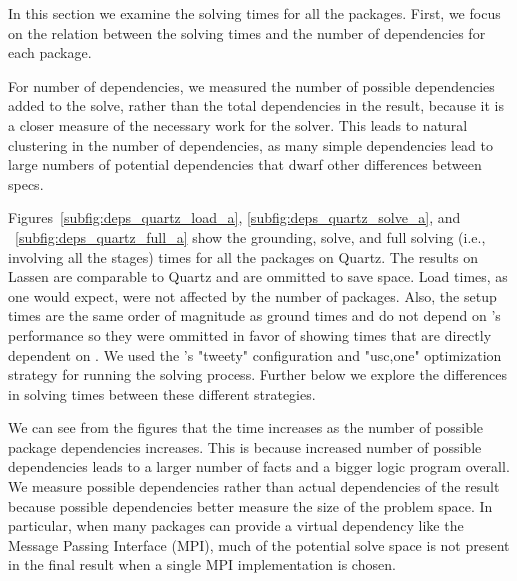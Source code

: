 In this section we examine the solving times for all the packages. First, we focus on the relation between the solving times and the number of dependencies for each package.

For number of dependencies, we measured the number of possible
dependencies added to the solve, rather than the total dependencies in
the result, because it is a closer measure of the necessary work for
the solver. This leads to natural clustering in the number of
dependencies, as many simple dependencies lead to large numbers of
potential dependencies that dwarf other differences between specs.

Figures~\ref{subfig:deps_quartz_load_a}, \ref{subfig:deps_quartz_solve_a}, and ~\ref{subfig:deps_quartz_full_a} show the grounding, solve, and full solving (i.e., involving all the stages) times for all the packages on Quartz. The results on Lassen are comparable to Quartz and are ommitted to save space. Load times, as one would expect, were not affected by the number of packages. Also, the setup times are the same order of magnitude as ground times and do not depend on \clingo{}'s performance so they were ommitted in favor of showing times that are directly dependent on \clingo{}. We used the \clingo{}'s "tweety" configuration and "usc,one" optimization strategy for running the solving process. Further below we explore the differences in solving times between these different strategies.

We can see from the figures that the time increases as the number of possible package dependencies increases. This is because increased number of possible dependencies leads to a larger number of facts and a bigger logic program overall. We measure possible dependencies rather than actual dependencies of the result because possible dependencies better measure the size of the problem space. In particular, when many packages can provide a virtual dependency like the Message Passing Interface (MPI), much of the potential solve space is not present in the final result when a single MPI implementation is chosen.

